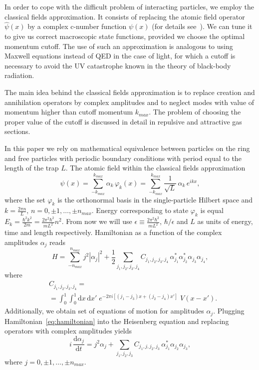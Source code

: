 \documentclass[aps,pra,reprint]{revtex4-2}
\begin{document}
In order to cope with the difficult problem of interacting particles, we employ 
the classical fields approximation. It consists of replacing the atomic field 
operator $\hat{\psi}(x)$ by a complex c-number function $\psi(x)$ 
(for details see~\cite{Brewczyk2007}). We can tune it to give us correct 
macroscopic state functions, provided we choose the optimal momentum cutoff. 
The use of such an approximation is analogous to using Maxwell equations 
instead of QED in the case of light, for which a cutoff is necessary to avoid 
the UV catastrophe known in the theory of black-body radiation.
    
The main idea behind the classical fields approximation is to replace creation 
and annihilation operators by complex amplitudes and to neglect modes with 
value of momentum higher than cutoff momentum $k_{max}$. The problem of 
choosing the proper value of the cutoff is discussed in detail in repulsive 
and attractive gas sections. 
    
In this paper we rely on mathematical equivalence between particles on the ring 
and free particles with periodic boundary conditions with period equal to 
the length of the trap $L$. The atomic field within the classical fields 
approximation
\begin{equation}
\psi(x) = \sum_{-k_{max}}^{k_{max}} \alpha_k \, \varphi_k(x) =
\sum_{-k_{max}}^{k_{max}} \frac{1}{\sqrt{L}} \, \alpha_k \, e^{i k x},
\end{equation}
where the set $\varphi_k$ is the orthonormal basis in the single-particle 
Hilbert space and $k=\frac{2 \pi n}{L}, \, n=0, \pm 1, \ldots , \pm n_{max}$. 
Energy corresponding to state $\varphi_k$ is equal 
$E_k = \frac{\hbar ^2 k^2}{2m}=\frac{2 \pi ^2 \hbar ^2}{m L^2} n^2$. From now 
we will use $\epsilon \equiv \frac{2 \pi ^2 \hbar ^2}{m L^2}$, 
$\hbar/ \epsilon$ and $L$ as units of energy, time and length respectively. 
Hamiltonian as a function of the complex amplitudes $\alpha_j$ reads
\begin{equation}
\label{Halpha}
H = \sum_{-n_{max}}^{n_{max}} j^2 |\alpha_j|^2 + \frac{1}{2} 
\sum_{j_1,j_2,j_3,j_4} C_{j_1,j_2,j_3,j_4} \, \alpha^*_{j_1} \alpha^*_{j_2} 
\alpha_{j_3} \alpha_{j_4},
\end{equation}
where
\begin{equation}
\begin{split}
&C_{j_1,j_2,j_3,j_4} = \\ 
& = \int_0^{1} \int_0^{1} \mathrm{d}x \, \mathrm{d}x' \; 
e^{-2 \pi i[(j_1-j_3)x+(j_2-j_4)x']} \; V(x-x').
\end{split}
\end{equation}
Additionally, we obtain set of equations of motion for amplitudes $\alpha _j$. 
Plugging Hamiltonian~\eqref{eq:hamiltonian} into the Heisenberg equation and 
replacing operators with complex amplitudes yields
\begin{equation}
\label{eq:eqs}
i \, \frac{\mathrm{d} \alpha_j}{\mathrm{d} t} = j^2 \alpha_j + 
\sum_{j_1,j_2,j_3} C_{j_1,j,j_2,j_3} \, \alpha^*_{j_1} \alpha_{j_2} 
\alpha_{j_3},
\end{equation}
where $j=0, \pm 1, \ldots ,\pm n_{max}$.
    
\end{document}
